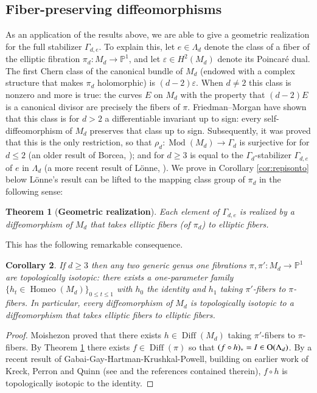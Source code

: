 \documentclass[10pt,letterpaper]{amsart}
\numberwithin{equation}{section}
\def\PP{{\mathbb P}}
\def\Pb{{\mathbb P}}
\newcommand{\eps}{\varepsilon}
\newcommand\Diff{\operatorname{Diff}}
\newcommand\Homeo{\operatorname{Homeo}}
\newcommand\Mod{\operatorname{Mod}}
\newcommand\Orth{\operatorname{O}}
\newtheorem{theorem}{Theorem}[section]
\newtheorem{corollary}[theorem]{Corollary}
\theoremstyle{remark}
\begin{document}
\subsection{Fiber-preserving diffeomorphisms}
As an application of the results above, we are able to give a geometric realization for the full stabilizer $\Gamma_{d,e}$. To explain this, let $e\in \Lambda_d$ denote the class of a fiber of the elliptic fibration $\pi_d:M_d\to\Pb^1$, and let $\eps\in H^2(M_d)$ denote its Poincar\'e 
dual.  The first Chern class of the canonical bundle of $M_d$ (endowed with a complex structure that makes $\pi_d$ holomorphic) is $(d-2)\eps$. When $d\neq 2$ this class is nonzero and  more is true: the curves $E$ on $M_d$ with the property that  $(d-2)E$ is a canonical divisor are precisely the fibers of $\pi$. Friedman--Morgan \cite{FM2} have shown  that this class is for $d> 2$ a differentiable invariant up to sign: every self-diffeomorphism of $M_d$ preserves that class up to sign.
Subsequently, it was proved that this is the only restriction, so that $\rho_d: \Mod(M_d)\to \Gamma_d$ is surjective for  for $d\le 2$ (an older result of Borcea, \cite{Bo}); and for $d\geq 3$ is equal to the $\Gamma_d$-stabilizer $\Gamma_{d,e}$ of $e$ in $\Lambda_d$ (a more recent result of L\"{o}nne, \cite{loenne2021}).
We prove in Corollary \ref{cor:repisonto} below L\"{o}nne's result can be lifted to the mapping class group of $\pi_d$ in the following sense:

\begin{theorem}[{\bf Geometric realization}]
\label{thm:repisonto}
Each element of $\Gamma_{d,e}$ is realized by  a diffeomorphism of $M_d$ that takes elliptic fibers (of $\pi_d$) to elliptic  fibers.
\end{theorem}

This has the following remarkable consequence.

\begin{corollary}
If $d\ge 3$ then any two generic genus one fibrations  $\pi,\pi':M_d\to \PP^1$ are {\em topologically isotopic}: there exists a one-parameter family $\{h_t\in \Homeo(M_d)\}_{0\le t\le 1}$ with $h_0$ the identity and $h_1$ taking $\pi'$-fibers to $\pi$-fibers.
In particular,  every diffeomorphism of $M_d$ is topologically isotopic to a diffeomorphism that takes elliptic fibers to elliptic fibers.
\end{corollary}

\begin{proof}
Moishezon \cite{M} proved that there exists $h\in\Diff(M_d)$ 
taking $\pi'$-fibers to $\pi$-fibers.  By Theorem \ref{thm:repisonto} 
there exists $f\in\Diff(\pi)$ so that $(f\circ h)_\ast={\rm I}\in\Orth(\Lambda_d)$.  
By a recent result of Gabai-Gay-Hartman-Krushkal-Powell, building on earlier work of Kreck, Perron and Quinn (see \cite{GGHKP} and the references contained therein), $f\circ h$ 
is topologically isotopic to the identity.
\end{proof}
\end{document}
